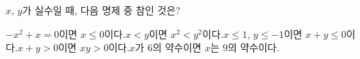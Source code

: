 $x$, $y$가 실수일 때, 다음 명제 중 참인 것은?
\begin{choicesv}{$-x^2+x=0$이면 $x\le 0$이다.}{$x<y$이면 $x^2<y^2$이다.}{$x\le 1$, $y\le -1$이면 $x+y\le 0$이다.}{$x+y>0$이면 $xy>0$이다.}{$x$가 $6$의 약수이면 $x$는 $9$의 약수이다.}\end{choicesv}
